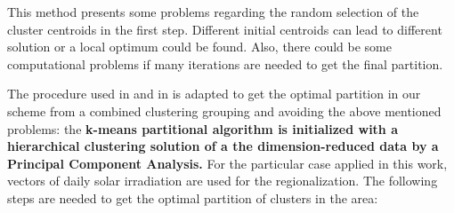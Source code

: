 This method presents some problems regarding the random selection of the cluster centroids in the first step. Different initial centroids can lead to different solution or a local optimum could be found. Also, there could be some computational problems if many iterations are needed to get the final partition.

The procedure used in \cite{Argueso2011} and in \cite{Zagouras2014} is adapted to get the optimal partition in our scheme from a combined clustering grouping and avoiding the above mentioned problems: the \textbf{k-means partitional algorithm is initialized with a hierarchical clustering solution of a the dimension-reduced data by a Principal Component Analysis.} For the particular case applied in this work, vectors of daily solar irradiation are used for the regionalization. The following steps are needed to get the optimal partition of clusters in the area:


